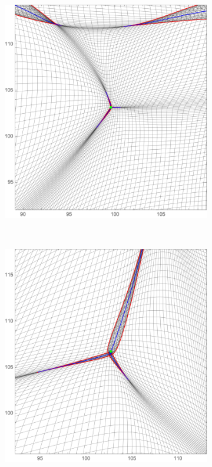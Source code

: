 \documentclass[a4paper, 11pt]{article}
\begin{document}
\begin{figure}
\begin{subfigure}[b]{0.24\textwidth}
\end{subfigure}~
\begin{subfigure}[b]{0.24\textwidth}
\includegraphics[width=\textwidth]{Elliptic_Z_Zoom}
\end{subfigure}~
\begin{subfigure}[b]{0.24\textwidth}
\includegraphics[width=\textwidth]{Hyperbollic_Z_Zoom}

\end{subfigure}
\end{figure}
\end{document}
